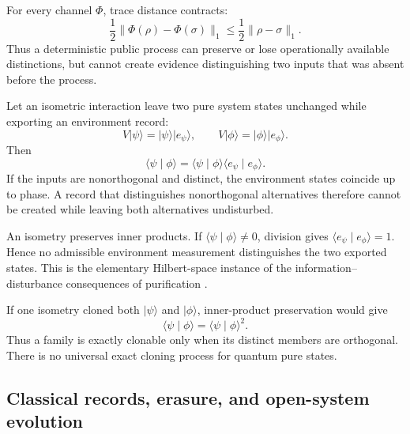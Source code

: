 \begin{corollary}
For every channel \(\Phi\), trace distance contracts:
\[
 \frac12\|\Phi(\rho)-\Phi(\sigma)\|_1
 \le
 \frac12\|\rho-\sigma\|_1.
\]
Thus a deterministic public process can preserve or lose operationally available
distinctions, but cannot create evidence distinguishing two inputs that was absent
before the process.
\end{corollary}


\begin{theorem}
\label{thm:no-information-without-disturbance-ledger}
Let an isometric interaction leave two pure system states unchanged while exporting
an environment record:
\[
 V\lvert\psi\rangle
 =\lvert\psi\rangle\lvert e_\psi\rangle,
 \qquad
 V\lvert\phi\rangle
 =\lvert\phi\rangle\lvert e_\phi\rangle.
\]
Then
\[
 \langle\psi\mid\phi\rangle
 =\langle\psi\mid\phi\rangle
  \langle e_\psi\mid e_\phi\rangle.
\]
If the inputs are nonorthogonal and distinct, the environment states coincide up to
phase.  A record that distinguishes nonorthogonal alternatives therefore cannot be
created while leaving both alternatives undisturbed.
\end{theorem}

\begin{proofsketch}
An isometry preserves inner products.  If
\(\langle\psi\mid\phi\rangle\ne0\), division gives
\(\langle e_\psi\mid e_\phi\rangle=1\).  Hence no admissible environment
measurement distinguishes the two exported states.  This is the elementary
Hilbert-space instance of the information--disturbance consequences of purification
\cite{chiribella-purification}.
\end{proofsketch}

\begin{corollary}
\label{cor:no-cloning-ledger}
If one isometry cloned both \(\lvert\psi\rangle\) and
\(\lvert\phi\rangle\), inner-product preservation would give
\[
 \langle\psi\mid\phi\rangle
 =\langle\psi\mid\phi\rangle^2.
\]
Thus a family is exactly clonable only when its distinct members are orthogonal.
There is no universal exact cloning process for quantum pure states.
\end{corollary}

\subsection{Classical records, erasure, and open-system evolution}

